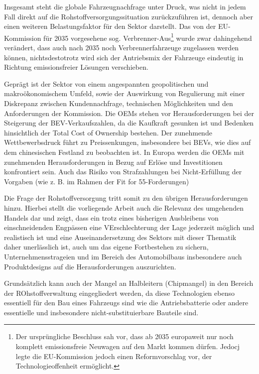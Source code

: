 \documentclass[12pt,a4paper,oneside]{book} %
\begin{document}
Insgesamt steht die globale Fahrzeugnachfrage unter Druck, was nicht in jedem Fall direkt auf die Rohstoffversorgungssituation zurückzuführen ist, dennoch aber einen weiteren Belastungsfaktor für den Sektor darstellt. Das von der EU-Kommission für 2035 vorgesehene sog. \glqq Verbrenner-Aus\grqq\footnote{Der ursprüngliche Beschluss sah vor, dass ab 2035 europaweit nur noch komplett emissionsfreie Neuwagen auf den Markt kommen dürfen. Jedocj legte die EU-Kommission jedoch einen Reformvorschlag vor, der Technologieoffenheit ermöglicht.} wurde zwar dahingehend verändert, dass auch nach 2035 noch Verbrennerfahrzeuge zugelassen werden können, nichtsdestotrotz wird sich der Antriebsmix der Fahrzeuge eindeutig in Richtung emissionsfreier Lösungen verschieben.

Geprägt ist der Sektor von einem angespannten geopolitischen und makroökonomischem Umfeld, sowie der Auswirkung von Regulierung mit einer Diskrepanz zwischen Kundennachfrage, technischen Möglichkeiten und den Anforderungen der Kommission. Die OEMs stehen vor Herausforderungen bei der Steigerung der BEV-Verkaufszahlen, da die Kaufkraft gesunken ist und Bedenken hinsichtlich der Total Cost of Ownership bestehen. Der zunehmende Wettbewerbsdruck führt zu Preissenkungen, insbesondere bei BEVs, wie dies auf dem chinesischen Festland zu beobachten ist. In Europa werden die OEMs mit zunehmenden Herausforderungen in Bezug auf Erlöse und Investitionen konfrontiert sein. Auch das Risiko von Strafzahlungen bei Nicht-Erfüllung der Vorgaben (wie z. B. im Rahmen der Fit for 55-Forderungen)

Die Frage der Rohstoffversorgung tritt somit zu den übrigen Herausforderungen hinzu. Hierbei stellt die vorliegende Arbeit auch die Relevanz des umgehenden Handels dar und zeigt, dass ein trotz eines bisherigen Ausbleibens von einschneidenden Engpässen eine VErschlechterung der Lage jederzeit möglich und realistisch ist und eine Auseinandersetzung des Sektors mit dieser Thematik daher unerlässlich ist, auch um das eigene Fortbestehen zu sichern, Unternehmensstrageien und im Bereich des Automobilbaus insbesondere auch Produktdesigns auf die Herausforderungen auszurichten.

Grundsätzlich kann auch der Mangel an Halbleitern (\glqq Chipmangel\grqq) in den Bereich der ROhstoffverwaltung eingegliedert werden, da diese Technologien ebenso essentiell für den Bau eines Fahrzeugs sind wie die Antriebsbatterie oder andere essentielle und insbesondere nicht-substituierbare Bauteile sind.
\end{document}
